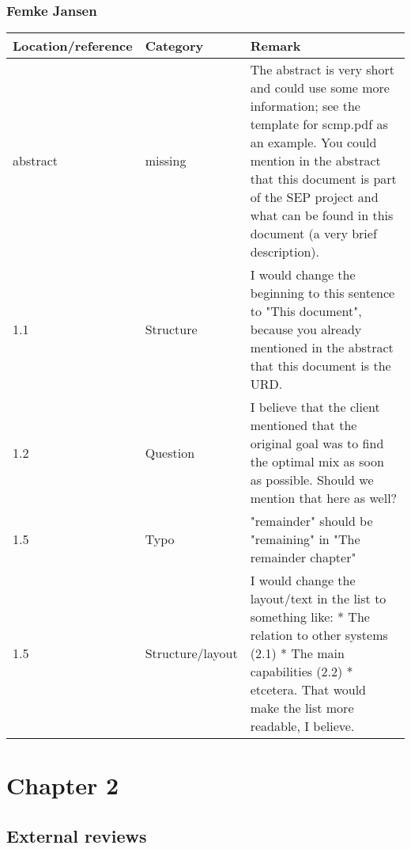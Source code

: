 \subsubsection*{Femke Jansen}

\begin{longtable}{l|l|p{}}
Location/reference & Category & Remark\\
\hline
\hline
\endhead
\hline
\endfoot
abstract & missing & The abstract is very short and could use some more information; see the template for scmp.pdf as an example. You could mention in the abstract that this document is part of the SEP project and what can be found in this document (a very brief description). \vspace{1em} \\
1.1 & Structure & I would change the beginning to this sentence to "This document", because you already mentioned in the abstract that this document is the URD.\vspace{1em} \\
1.2 & Question & I believe that the client mentioned that the original goal was to find the optimal mix as soon as possible. Should we mention that here as well? \vspace{1em} \\
1.5 & Typo & "remainder" should be "remaining" in "The remainder chapter"\\ 
1.5 & Structure/layout & I would change the layout/text in the list to something like:
* The relation to other systems (2.1)
* The main capabilities (2.2)
* etcetera.
That would make the list more readable, I believe.\\
\end{longtable}

\section{Chapter 2}
\subsection{External reviews}
